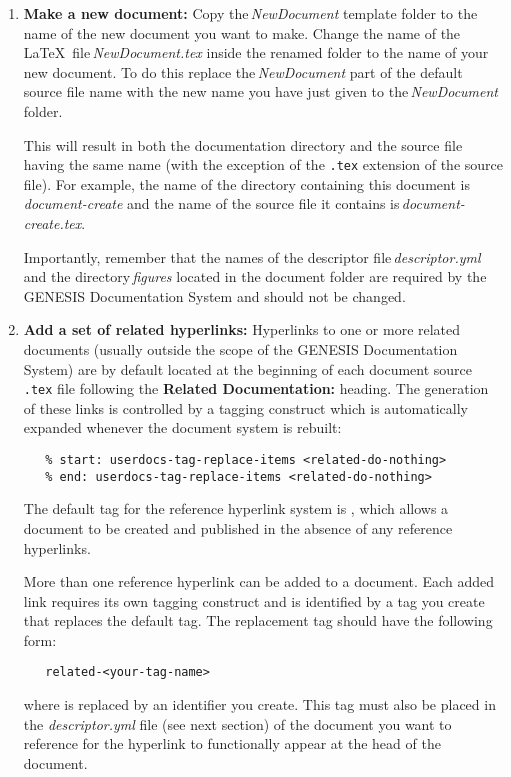\documentclass[12pt]{article}
\begin{document}
\begin{enumerate}

\item {\bf Make a new document:} Copy the\,{\it NewDocument} template folder to the name of the new document you want to make. Change the name of the \LaTeX\,\,\,file\,{\it NewDocument.tex} inside the renamed folder to the name of your new document. To do this replace the\,{\it NewDocument} part of the default source file name with the new name you have just given to the\,{\it NewDocument} folder.

This will result in both the documentation directory and the source file having the same name (with the exception of the {\tt .tex} extension of the source file). For example, the name of the directory containing this document is {\it document-create} and the name of the source file it contains is\,{\it document-create.tex}.

Importantly, remember that the names of the descriptor file\,{\it descriptor.yml} and the directory\,{\it figures} located in the document folder are required by the GENESIS Documentation System and should not be changed.

\item {\bf Add a set of related hyperlinks:} Hyperlinks to one or more related documents (usually outside the scope of the GENESIS Documentation System) are by default located at the beginning of each document source {\tt .tex} file following the {\bf Related Documentation:} heading. The generation of these links is controlled by a tagging construct which is automatically expanded whenever the document system is rebuilt:
\begin{verbatim}
   % start: userdocs-tag-replace-items <related-do-nothing>
   % end: userdocs-tag-replace-items <related-do-nothing>
\end{verbatim}
The default tag for the reference hyperlink system is {\tt <related-do-nothing>}, which allows a document to be created and published in the absence of any reference hyperlinks. 

More than one reference hyperlink can be added to a document. Each added link requires its own tagging construct and is identified by a tag you create that replaces the default tag. The replacement tag should have the following form:
\begin{verbatim}
   related-<your-tag-name>
\end{verbatim}
where {\tt <your-tag-name>} is replaced by an identifier you create. This tag must also be placed in the {\it descriptor.yml} file (see next section) of the document you want to reference for the hyperlink to functionally appear at the head of the document.


\end{enumerate}
\end{document}
